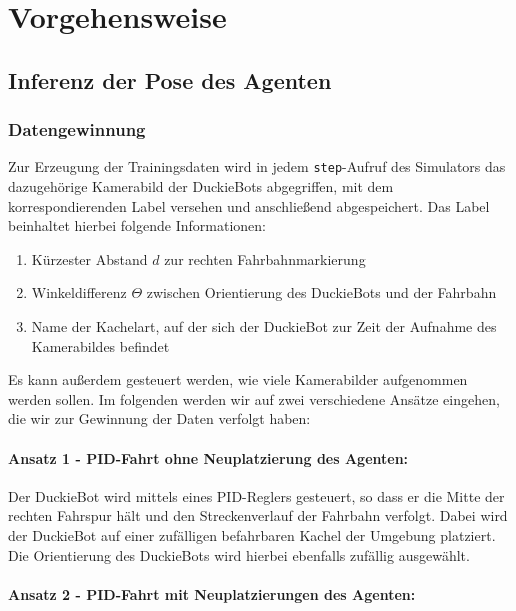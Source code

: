 
\chapter{Vorgehensweise}

\section{Inferenz der Pose des Agenten}

\subsection{Datengewinnung}

Zur Erzeugung der Trainingsdaten wird in jedem \texttt{step}-Aufruf des Simulators das dazugehörige Kamerabild der DuckieBots abgegriffen, mit dem korrespondierenden Label versehen und anschließend abgespeichert. Das Label beinhaltet hierbei folgende Informationen:

\begin{enumerate}
	\item Kürzester Abstand $d$ zur rechten Fahrbahnmarkierung
	\item Winkeldifferenz $\Theta$ zwischen Orientierung des DuckieBots und der Fahrbahn
	\item Name der Kachelart, auf der sich der DuckieBot zur Zeit der Aufnahme des Kamerabildes befindet
\end{enumerate}

Es kann außerdem gesteuert werden, wie viele Kamerabilder aufgenommen werden sollen.
Im folgenden werden wir auf zwei verschiedene Ansätze eingehen, die wir zur Gewinnung der Daten verfolgt haben:

\subsubsection{Ansatz 1 - PID-Fahrt ohne Neuplatzierung des Agenten:}

Der DuckieBot wird mittels eines PID-Reglers gesteuert, so dass er die Mitte der rechten Fahrspur hält und den Streckenverlauf der Fahrbahn verfolgt. Dabei wird der DuckieBot auf einer zufälligen befahrbaren Kachel der Umgebung platziert. Die Orientierung des DuckieBots  wird hierbei ebenfalls zufällig ausgewählt.

\subsubsection{Ansatz 2 - PID-Fahrt mit Neuplatzierungen des Agenten:}

